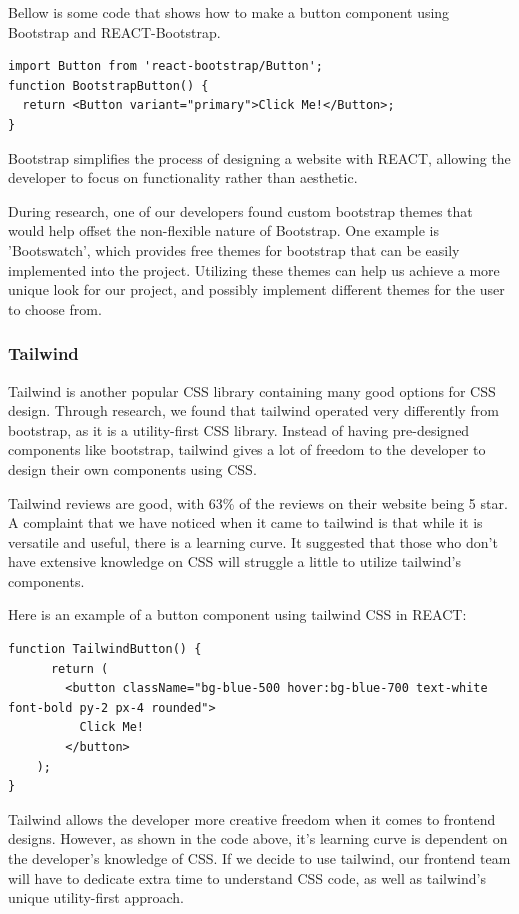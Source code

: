 \documentclass[12pt,titlepage]{article}
\begin{document}
Bellow is some code that shows how to make a button component using Bootstrap and REACT-Bootstrap.
\begin{verbatim}
import Button from 'react-bootstrap/Button';
function BootstrapButton() {
  return <Button variant="primary">Click Me!</Button>;
}

\end{verbatim}

Bootstrap simplifies the process of designing a website with REACT, allowing the developer to focus on functionality rather than aesthetic.


During research, one of our developers found custom bootstrap themes that would help offset the non-flexible nature of Bootstrap.
One example is 'Bootswatch', which provides free themes for bootstrap that can be easily implemented into the project.
Utilizing these themes can help us achieve a more unique look for our project, and possibly implement different themes for the user to choose from.


\subsubsection{Tailwind}
Tailwind is another popular CSS library containing many good options for CSS design.
Through research, we found that tailwind operated very differently from bootstrap, as it is a utility-first CSS library.
Instead of having pre-designed components like bootstrap, tailwind gives a lot of freedom to the developer to design their own components using CSS.

Tailwind reviews are good, with 63\% of the reviews on their website being 5 star.
A complaint that we have noticed when it came to tailwind is that while it is versatile and useful, there is a learning curve.
It suggested that those who don't have extensive knowledge on CSS will struggle a little to utilize tailwind's components.

Here is an example of a button component using tailwind CSS in REACT:
\begin{verbatim}
function TailwindButton() {
	  return (
		<button className="bg-blue-500 hover:bg-blue-700 text-white font-bold py-2 px-4 rounded">
		  Click Me!
		</button>
	);
}

\end{verbatim}


Tailwind allows the developer more creative freedom when it comes to frontend designs.
However, as shown in the code above, it's learning curve is dependent on the developer's knowledge of CSS.
If we decide to use tailwind, our frontend team will have to dedicate extra time to understand CSS code, as well as tailwind's unique utility-first approach.
\end{document}
